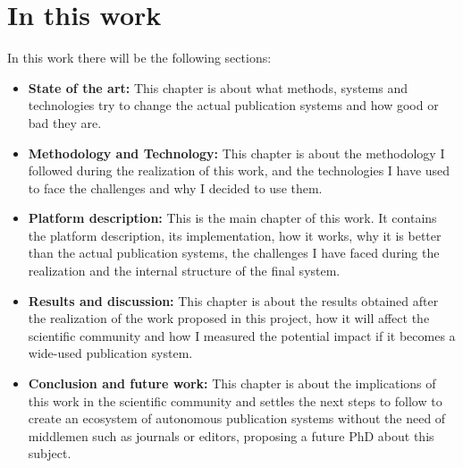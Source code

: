   \section{In this work}
  In this work there will be the following sections:
  \begin{itemize}
  \item \textbf{State of the art:} This chapter is about what methods, systems
    and technologies try to change the actual publication systems and how good
    or bad they are.
  \item \textbf{Methodology and Technology:} This chapter is about the
    methodology I followed during the realization of this work, and the
    technologies I have used to face the challenges and why I decided to use
    them.
  \item \textbf{Platform description:} This is the main chapter of this work. It
    contains the platform description, its implementation, how it works, why it is
    better than the actual publication systems, the challenges I have faced
    during the realization and the internal structure of the final system.
  \item \textbf{Results and discussion:} This chapter is about the results
    obtained after the realization of the work proposed in this project, how it
    will affect the scientific community and how I measured the potential impact
    if it becomes a wide-used publication system.
  \item \textbf{Conclusion and future work:} This chapter is about the
    implications of this work in the scientific community and settles the next
    steps to follow to create an ecosystem of autonomous publication systems
    without the need of middlemen such as journals or editors, proposing a
    future PhD about this subject.
  \end{itemize}


